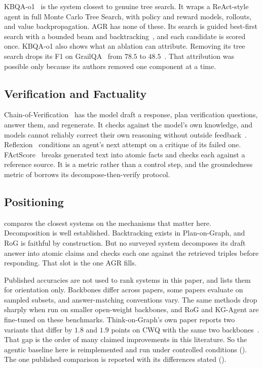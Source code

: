 KBQA-o1~\cite{luo2025kbqao1} is the system closest to genuine tree search. It
wraps a ReAct-style~\cite{yao2023react} agent in full Monte Carlo Tree Search,
with policy and reward models, rollouts, and value backpropagation. AGR has none
of these. Its search is guided best-first search with a bounded beam and
backtracking~\cite{pearl1984heuristics}, and each candidate is scored once.
KBQA-o1 also shows what an ablation can attribute. Removing its tree search
drops its F1 on GrailQA~\cite{gu2021beyond} from $78.5$ to
$48.5$~\cite{luo2025kbqao1}. That attribution was possible only because its
authors removed one component at a time.

\subsection{Verification and Factuality}

Chain-of-Verification~\cite{dhuliawala2024chain} has the model draft a response,
plan verification questions, answer them, and regenerate. It checks against the
model's own knowledge, and models cannot reliably correct their own reasoning
without outside feedback~\cite{huang2024selfcorrect}.
Reflexion~\cite{shinn2023reflexion} conditions an agent's next attempt on a
critique of its failed one. FActScore~\cite{min2023factscore} breaks generated
text into atomic facts and checks each against a reference source. It is a
metric rather than a control step, and the groundedness metric of
 borrows its decompose-then-verify protocol.

\subsection{Positioning}

 compares the closest systems on the mechanisms that matter
here. Decomposition is well established. Backtracking exists in Plan-on-Graph,
and RoG is faithful by construction. But no surveyed system decomposes its draft
answer into atomic claims and checks each one against the retrieved triples
before responding. That slot is the one AGR fills.

Published accuracies are not used to rank systems in this paper, and
 lists them for orientation only. Backbones differ across
papers, some papers evaluate on sampled subsets, and answer-matching conventions
vary. The same methods drop sharply when run on smaller open-weight backbones,
and RoG and KG-Agent are fine-tuned on these benchmarks. Think-on-Graph's own
paper reports two variants that differ by $1.8$ and $1.9$ points on CWQ with the
same two backbones~\cite{sun2024think}. That gap is the order of many claimed
improvements in this literature. So the agentic baseline here is reimplemented
and run under controlled conditions (). The one published
comparison is reported with its differences stated ().

